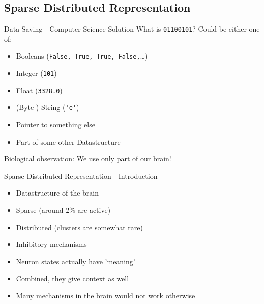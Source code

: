 
\subsection{Sparse Distributed Representation}


\begin{frame}[c,fragile]{Data Saving - Computer Science Solution}
    \Large
    What is \verb|01100101|? \pause Could be either one of:
    \begin{itemize}[<+(1)->]
        \item Booleans (\verb|False, True, True, False,|\dots)
        \item Integer (\verb|101|)
        \item Float (\verb|3328.0|)
        \item (Byte-) String (\verb|'e'|)
        \item Pointer to something else
        \item Part of some other Datastructure
    \end{itemize}
\end{frame}


\begin{frame}[c,standout]
    Biological observation: \newline
    We use only part of our brain!
\end{frame}


\begin{frame}[c]{Sparse Distributed Representation - Introduction}
    \Large
    \begin{itemize}[<+(1)->]
        \item Datastructure of the brain
        \item Sparse (around 2\% are active)
        \item Distributed (clusters are somewhat rare)
        \item Inhibitory mechanisms
        \item Neuron states actually have 'meaning'
        \item Combined, they give context as well
        \item Many mechanisms in the brain would not work otherwise
    \end{itemize}
\end{frame}



